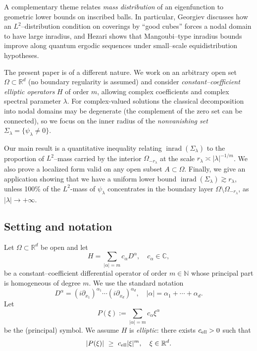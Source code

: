 \documentclass[12pt, reqno]{amsart}
\theoremstyle{plain}
\theoremstyle{remark}
\newcommand{\C}{\mathbb{C}}
\newcommand{\R}{\mathbb{R}}
\newcommand{\N}{\mathbb{N}}
\newcommand{\inrad}{\operatorname{inrad}}
\begin{document}
A complementary theme relates \emph{mass distribution} of an eigenfunction to geometric lower bounds on inscribed balls. In particular, Georgiev \cite{Geo19} discusses how an $L^2$--distribution condition on coverings by ``good cubes'' forces a nodal domain to have large inradius, and Hezari \cite{Hez18} shows that Mangoubi--type inradius bounds improve along quantum ergodic sequences under small--scale equidistribution hypotheses.

The present paper is of a different nature. We work on an arbitrary open set $\Omega\subset\R^d$ (no boundary regularity is assumed) and consider \emph{constant--coefficient elliptic operators} $H$ of order $m$, allowing complex coefficients and complex spectral parameter $\lambda$. For complex-valued solutions the classical decomposition into nodal domains may be degenerate (the complement of the zero set can be connected), so we focus on the inner radius of the \emph{nonvanishing set} $\Sigma_\lambda=\{\psi_\lambda\neq 0\}$.

Our main result is a quantitative inequality relating $\inrad(\Sigma_\lambda)$ to the proportion of $L^2$--mass carried by the interior $\Omega_{-r_\lambda}$ at the scale $r_\lambda\asymp|\lambda|^{-1/m}$.
We also prove a localized form valid on any open subset $A\subset\Omega$.
Finally, we give an application showing that we have a uniform lower bound $\inrad(\Sigma_\lambda)\gtrsim r_\lambda$, unless 100\% of the $L^2$-mass of $\psi_\lambda$ concentrates in the boundary layer $\Omega\setminus\Omega_{-r_\lambda}$, as $|\lambda|\to+\infty$.

\subsection{Setting and notation}

Let $\Omega\subset\R^d$ be open and let
$$
H = \sum_{|\alpha| = m} c_\alpha D^\alpha,\quad c_\alpha\in\C,
$$
be a constant--coefficient differential operator of order $m\in\N$ whose principal part is homogeneous of degree $m$.
We use the standard notation
$$
D^\alpha = (i\partial_{x_1})^{\alpha_1}\cdots(i\partial_{x_d})^{\alpha_d},
\quad |\alpha| = \alpha_1+\cdots+\alpha_d.
$$
Let
$$
P(\xi) := \sum_{|\alpha| = m} c_\alpha \xi^\alpha
$$
be the (principal) symbol.
We assume $H$ is \emph{elliptic}: there exists $c_{\rm ell}>0$ such that
\begin{equation}\label{eq:ellipticity}
|P(\xi)|\ \ge\ c_{\rm ell} |\xi|^m,\quad \xi\in\R^d.
\end{equation}
\end{document}
